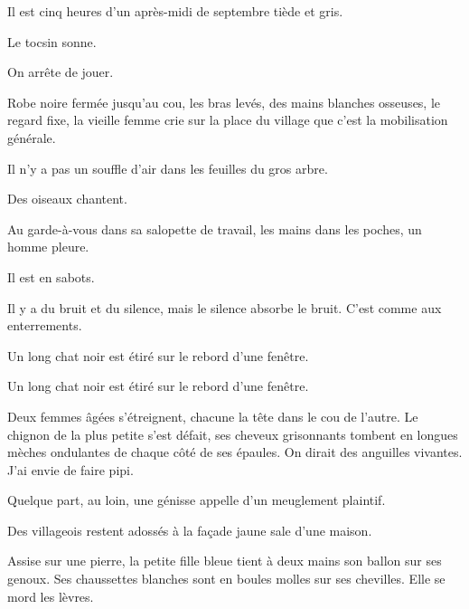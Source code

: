 
{

Il est cinq heures d'un après-midi de septembre tiède et gris.

Le tocsin sonne.

On arrête de jouer.


\bigskip

Robe noire fermée jusqu'au cou, les bras levés, des mains blanches
osseuses, le regard fixe, la vieille femme crie sur la place du
village que c'est la mobilisation générale.

Il n'y a pas un souffle d'air dans les feuilles du gros arbre.

Des oiseaux chantent.

\bigskip

Au garde-à-vous dans sa salopette de travail, les mains dans les
poches, un homme pleure.

Il est en sabots.

Il y a du bruit et du silence, mais le silence absorbe le bruit. C'est
comme aux enterrements.

Un long chat noir est étiré sur le rebord d'une fenêtre.

Un long chat noir est étiré sur le rebord d'une fenêtre.

Deux femmes âgées s'étreignent, chacune la tête dans le cou de
l'autre. Le chignon de la plus petite s'est défait, ses cheveux
grisonnants tombent en longues mèches ondulantes de chaque côté de
ses épaules. On dirait des anguilles vivantes. J'ai envie de faire
pipi.

Quelque part, au loin, une génisse appelle d'un meuglement plaintif.

Des villageois restent adossés à la façade jaune sale d'une maison.

Assise sur une pierre, la petite fille bleue tient à deux mains son
ballon sur ses genoux. Ses chaussettes blanches sont en boules molles
sur ses chevilles. Elle se mord les lèvres.

}
